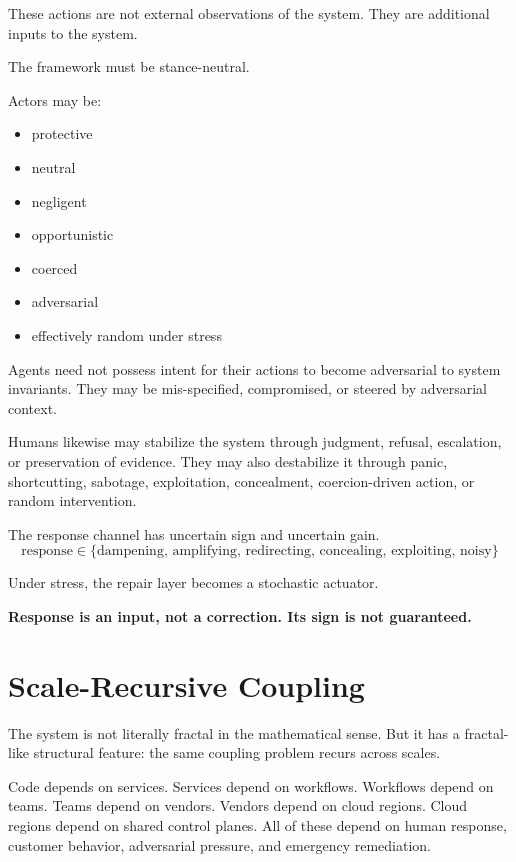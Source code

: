 \documentclass[11pt]{article}
\begin{document}
These actions are not external observations of the system. They are additional inputs to the system.

The framework must be stance-neutral.

Actors may be:
\begin{itemize}
\item protective
\item neutral
\item negligent
\item opportunistic
\item coerced
\item adversarial
\item effectively random under stress
\end{itemize}

Agents need not possess intent for their actions to become adversarial to system invariants. They may be mis-specified, compromised, or steered by adversarial context.

Humans likewise may stabilize the system through judgment, refusal, escalation, or preservation of evidence. They may also destabilize it through panic, shortcutting, sabotage, exploitation, concealment, coercion-driven action, or random intervention.

The response channel has uncertain sign and uncertain gain.
\[
\text{response} \in \{\text{dampening},\, \text{amplifying},\, \text{redirecting},\, \text{concealing},\, \text{exploiting},\, \text{noisy}\}
\]

Under stress, the repair layer becomes a stochastic actuator.

\begin{pullquote}
\textbf{Response is an input, not a correction. Its sign is not guaranteed.}
\end{pullquote}

\section{Scale-Recursive Coupling}

The system is not literally fractal in the mathematical sense. But it has a fractal-like structural feature: the same coupling problem recurs across scales.

Code depends on services. Services depend on workflows. Workflows depend on teams. Teams depend on vendors. Vendors depend on cloud regions. Cloud regions depend on shared control planes. All of these depend on human response, customer behavior, adversarial pressure, and emergency remediation.
\end{document}

